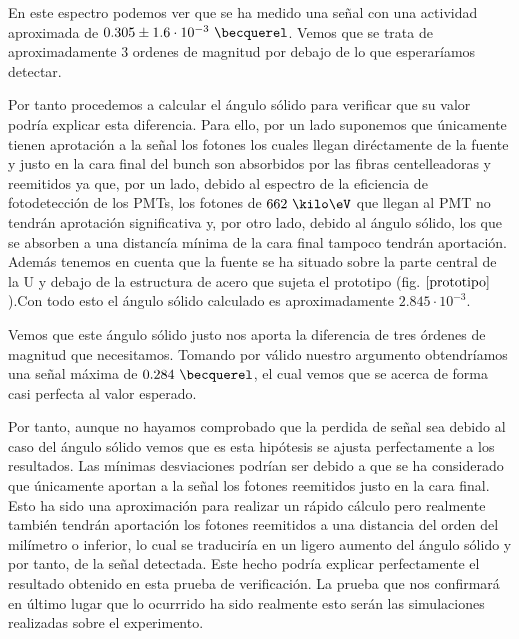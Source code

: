 En este espectro podemos ver que se ha medido una señal con una actividad aproximada de $0.305 \pm 1.6 \cdot 10^{-3}~\becquerel$. Vemos que se trata de aproximadamente 3 ordenes de magnitud por debajo de lo que esperaríamos detectar.

Por tanto procedemos a calcular el ángulo sólido para verificar que su valor podría explicar esta diferencia. Para ello, por un lado suponemos que únicamente tienen aprotación a la señal los fotones los cuales llegan diréctamente de la fuente y justo en la cara final del bunch son absorbidos por las fibras centelleadoras y reemitidos ya que, por un lado, debido al espectro de la eficiencia de fotodetección de los PMTs, los fotones de $662~\kilo\eV$ que llegan al PMT no tendrán aprotación significativa y, por otro lado, debido al ángulo sólido, los que se absorben a una distancía mínima de la cara final tampoco tendrán aportación. Además tenemos en cuenta que la fuente se ha situado sobre la parte central de la U y debajo de la estructura de acero que sujeta el prototipo (fig. $\ref{prototipo}$).Con todo esto el ángulo sólido calculado es aproximadamente $2.845 \cdotp 10^{-3}$. 

Vemos que este ángulo sólido justo nos aporta la diferencia de tres órdenes de magnitud que necesitamos. Tomando por válido nuestro argumento obtendríamos una señal máxima de $0.284~\becquerel$, el cual vemos que se acerca de forma casi perfecta al valor esperado.

Por tanto, aunque no hayamos comprobado que la perdida de señal sea debido al caso del ángulo sólido vemos que es esta hipótesis se ajusta perfectamente a los resultados. Las mínimas desviaciones podrían ser debido a que se ha considerado que únicamente aportan a la señal los fotones reemitidos justo en la cara final. Esto ha sido una aproximación para realizar un rápido cálculo pero realmente también tendrán aportación los fotones reemitidos a una distancia del orden del milímetro o inferior, lo cual se traduciría en un ligero aumento del ángulo sólido y por tanto, de la señal detectada. Este hecho podría explicar perfectamente el resultado obtenido en esta prueba de verificación. La prueba que nos confirmará en último lugar que lo ocurrrido ha sido realmente esto serán las simulaciones realizadas sobre el experimento.
